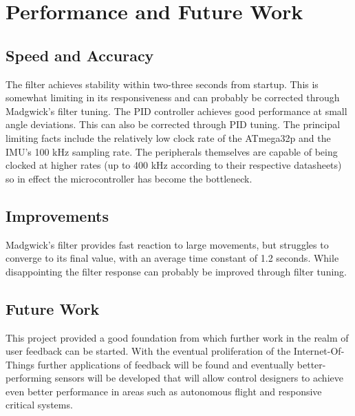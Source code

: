 \chapter{Performance and Future Work}



\section{Speed and Accuracy}

The filter achieves stability within two-three seconds from startup.  This is somewhat limiting in its responsiveness and can probably be corrected through Madgwick's filter tuning.  The PID controller achieves good performance at small angle deviations.  This can also be corrected through PID tuning.  The principal limiting facts include the relatively low clock rate of the ATmega32p and the IMU's 100 kHz sampling rate.  The peripherals themselves are capable of being clocked at higher rates (up to 400 kHz according to their respective datasheets) so in effect the microcontroller has become the bottleneck.

\section{Improvements}

Madgwick's filter provides fast reaction to large movements, but struggles to converge to its final value, with an average time constant of 1.2 seconds.  While disappointing the filter response can probably be improved through filter tuning.

\section{Future Work}

This project provided a good foundation from which further work in the realm of user feedback can be started.  With the eventual proliferation of the Internet-Of-Things further applications of feedback will be found and eventually better-performing sensors will be developed that will allow control designers to achieve even better performance in areas such as autonomous flight and responsive critical systems.